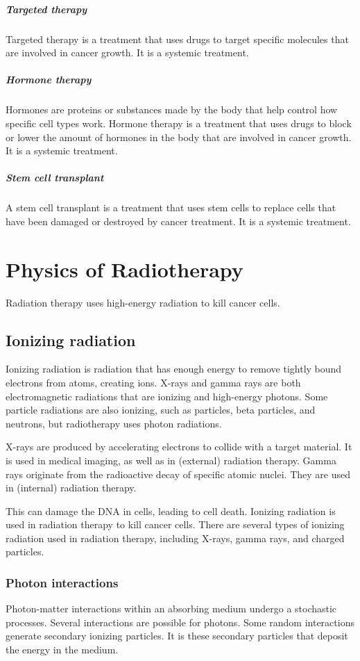 \subparagraph{Targeted therapy}
Targeted therapy is a treatment that uses drugs to target specific molecules that are involved in cancer growth.
It is a systemic treatment.

\subparagraph{Hormone therapy}
Hormones are proteins or substances made by the body that help control how specific cell types work.
Hormone therapy is a treatment that uses drugs to block or lower the amount of hormones in the body that are involved in cancer growth.
It is a systemic treatment.

\subparagraph{Stem cell transplant}
A stem cell transplant is a treatment that uses stem cells to replace cells that have been damaged or destroyed by cancer treatment.
It is a systemic treatment.

\section{Physics of Radiotherapy}

Radiation therapy uses high-energy radiation to kill cancer cells.

\subsection{Ionizing radiation}
Ionizing radiation is radiation that has enough energy to remove tightly bound electrons from atoms, creating ions.
X-rays and gamma rays are both electromagnetic radiations that are ionizing and high-energy photons.
Some particle radiations are also ionizing, such as particles, beta particles, and neutrons, but radiotherapy uses photon radiations.

X-rays are produced by accelerating electrons to collide with a target material.
It is used in medical imaging, as well as in (external) radiation therapy.
Gamma rays originate from the radioactive decay of specific atomic nuclei.
They are used in (internal) radiation therapy.

This can damage the DNA in cells, leading to cell death.
Ionizing radiation is used in radiation therapy to kill cancer cells.
There are several types of ionizing radiation used in radiation therapy, including X-rays, gamma rays, and charged particles.

\subsubsection{Photon interactions}
Photon-matter interactions within an absorbing medium undergo a stochastic processes.
Several interactions are possible for photons.
Some random interactions generate secondary ionizing particles.
It is these secondary particles that deposit the energy in the medium.

